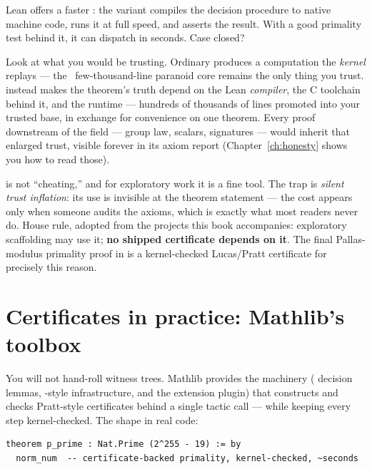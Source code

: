 Lean offers a faster : the variant 
compiles the decision procedure to native machine code, runs it at full
speed, and asserts the result. With a good primality test behind it, it can
dispatch  in seconds. Case closed?

Look at what you would be trusting. Ordinary  produces a
computation the \emph{kernel} replays --- the ~few-thousand-line paranoid
core remains the only thing you trust.  instead makes
the theorem's truth depend on the Lean \emph{compiler}, the C toolchain
behind it, and the runtime --- hundreds of thousands of lines promoted into
your trusted base, in exchange for convenience on one theorem. Every proof
downstream of the field --- group law, scalars, signatures --- would inherit
that enlarged trust, visible forever in its axiom report
(Chapter~\ref{ch:honesty} shows you how to read those).

\begin{pitfall}
 is not ``cheating,'' and for exploratory work it is a
fine tool. The trap is \emph{silent trust inflation}: its use is invisible at
the theorem statement --- the cost appears only when someone audits the
axioms, which is exactly what most readers never do. House rule, adopted from
the projects this book accompanies: exploratory scaffolding may use it;
\textbf{no shipped certificate depends on it}. The final Pallas-modulus
primality proof in  is a kernel-checked
Lucas/Pratt certificate for precisely this reason.
\end{pitfall}

\section{Certificates in practice: Mathlib's toolbox}

You will not hand-roll witness trees. Mathlib provides the machinery
( decision lemmas, -style infrastructure,
and the  extension  plugin) that constructs
and checks Pratt-style certificates behind a single tactic call --- while
keeping every step kernel-checked. The shape in real code:

\begin{lstlisting}[language=Lean]
theorem p_prime : Nat.Prime (2^255 - 19) := by
  norm_num  -- certificate-backed primality, kernel-checked, ~seconds
\end{lstlisting}


